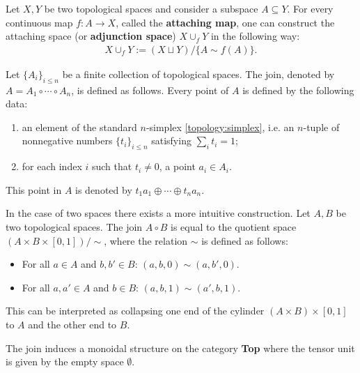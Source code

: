     \begin{construct}\label{topology:attaching_space}
        Let $X,Y$ be two topological spaces and consider a subspace $A\subseteq Y$. For every continuous map $f:A\rightarrow X$, called the \textbf{attaching map}, one can construct the attaching space (or \textbf{adjunction space}) $X\cup_f Y$ in the following way:
        \begin{gather}
            X\cup_f Y := (X\sqcup Y)/\{A\sim f(A)\}.
        \end{gather}
    \end{construct}

    \begin{construct}[Join]\label{topology:join}
        Let $\{A_i\}_{i\leq n}$ be a finite collection of topological spaces. The join, denoted by $A=A_1\circ\cdots\circ A_n$, is defined as follows. Every point of $A$ is defined by the following data:
        \begin{enumerate}
            \item an element of the standard $n$-simplex \ref{topology:simplex}, i.e. an $n$-tuple of nonnegative numbers $\{t_i\}_{i\leq n}$ satisfying $\sum_it_i=1$;
            \item for each index $i$ such that $t_i\neq 0$, a point $a_i\in A_i$.
        \end{enumerate}
        This point in $A$ is denoted by $t_1a_1\oplus\cdots\oplus t_na_n$.

        In the case of two spaces there exists a more intuitive construction. Let $A,B$ be two topological spaces. The join $A\circ B$ is equal to the quotient space $(A\times B\times[0,1])/\sim$, where the relation $\sim$ is defined as follows:
        \begin{itemize}
            \item For all $a\in A$ and $b,b'\in B$: $(a,b,0)\sim(a,b',0)$.
            \item For all $a,a'\in A$ and $b\in B$: $(a,b,1)\sim(a',b,1)$.
        \end{itemize}
        This can be interpreted as collapsing one end of the cylinder $(A\times B)\times[0,1]$ to $A$ and the other end to $B$.
    \end{construct}
    \begin{property}
        The join induces a monoidal structure on the category \textbf{Top} where the tensor unit is given by the empty space $\emptyset$.
    \end{property}

